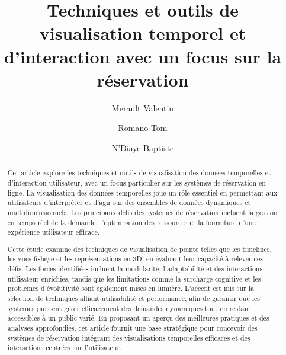 \documentclass[runningheads]{llncs}
\begin{document}
%
\title{Techniques et outils de visualisation temporel et d'interaction avec un focus sur la réservation}
%
%
\author{Merault Valentin \and
Romano Tom \and
N'Diaye Baptiste}
%
%
%
\maketitle              %
%
\begin{abstract}
Cet article explore les techniques et outils de visualisation des données temporelles et d'interaction utilisateur, avec un focus particulier sur les systèmes de réservation en ligne. La visualisation des données temporelles joue un rôle essentiel en permettant aux utilisateurs d'interpréter et d'agir sur des ensembles de données dynamiques et multidimensionnels. Les principaux défis des systèmes de réservation incluent la gestion en temps réel de la demande, l'optimisation des ressources et la fourniture d'une expérience utilisateur efficace.

Cette étude examine des techniques de visualisation de pointe telles que les timelines, les vues fisheye et les représentations en 3D, en évaluant leur capacité à relever ces défis. Les forces identifiées incluent la modularité, l’adaptabilité et des interactions utilisateur enrichies, tandis que les limitations comme la surcharge cognitive et les problèmes d’évolutivité sont également mises en lumière. L'accent est mis sur la sélection de techniques alliant utilisabilité et performance, afin de garantir que les systèmes puissent gérer efficacement des demandes dynamiques tout en restant accessibles à un public varié. En proposant un aperçu des meilleures pratiques et des analyses approfondies, cet article fournit une base stratégique pour concevoir des systèmes de réservation intégrant des visualisations temporelles efficaces et des interactions centrées sur l'utilisateur.

\end{abstract}
%
%
%
\end{document}
